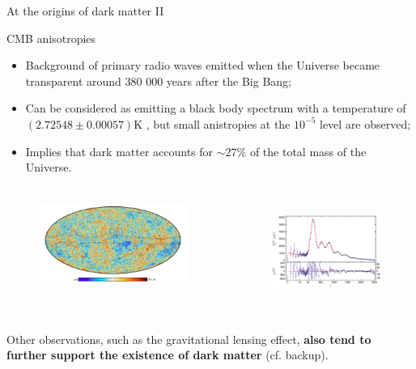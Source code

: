 \documentclass[8pt]{beamer}
\begin{document}
\begin{frame}{At the origins of dark matter II}
\justifying

\vspace{5pt}
\begin{block}{ \centering CMB anisotropies}\end{block}

\begin{itemize}
\justifying
\item Background of primary radio waves emitted when the Universe became transparent around 380 000 years after the Big Bang;
\item Can be considered as emitting a black body spectrum with a temperature of $(2.72548\pm 0.00057)$K \cite{CMBTemperature}, but small anistropies at the $10^{-5}$ level are observed;
\item Implies that dark matter \alert{accounts for $\sim 27\%$ of the total mass of the Universe}.
\end{itemize} \vfill

\begin{columns}
	\begin{column}{0.54\textwidth}
\begin{figure}[htbp]
\begin{center}
\includegraphics[width=6.5cm, height=3cm]{figs/PlanckTemperature.png}
\end{center}
\end{figure}
\end{column}
\begin{column}{0.44\textwidth}
\begin{figure}[htbp]
\begin{center}
\includegraphics[width=5cm, height=3.5cm]{figs/PlanckSpectrum.png}
\end{center}
\end{figure}
\end{column}
\end{columns} \vfill

Other observations, such as the gravitational lensing effect, \textbf{also tend to further support the existence of dark matter} (cf. backup). \vfill
\end{frame}
\end{document}
